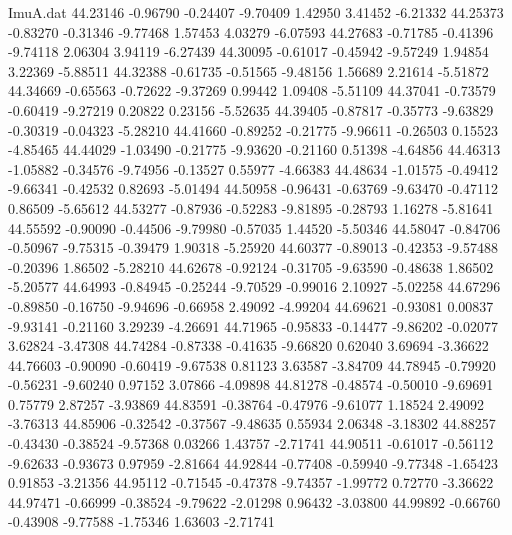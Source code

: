 \begin{filecontents}{ImuA.dat}
  44.23146   -0.96790   -0.24407   -9.70409    1.42950    3.41452   -6.21332
  44.25373   -0.83270   -0.31346   -9.77468    1.57453    4.03279   -6.07593
  44.27683   -0.71785   -0.41396   -9.74118    2.06304    3.94119   -6.27439
  44.30095   -0.61017   -0.45942   -9.57249    1.94854    3.22369   -5.88511
  44.32388   -0.61735   -0.51565   -9.48156    1.56689    2.21614   -5.51872
  44.34669   -0.65563   -0.72622   -9.37269    0.99442    1.09408   -5.51109
  44.37041   -0.73579   -0.60419   -9.27219    0.20822    0.23156   -5.52635
  44.39405   -0.87817   -0.35773   -9.63829   -0.30319   -0.04323   -5.28210
  44.41660   -0.89252   -0.21775   -9.96611   -0.26503    0.15523   -4.85465
  44.44029   -1.03490   -0.21775   -9.93620   -0.21160    0.51398   -4.64856
  44.46313   -1.05882   -0.34576   -9.74956   -0.13527    0.55977   -4.66383
  44.48634   -1.01575   -0.49412   -9.66341   -0.42532    0.82693   -5.01494
  44.50958   -0.96431   -0.63769   -9.63470   -0.47112    0.86509   -5.65612
  44.53277   -0.87936   -0.52283   -9.81895   -0.28793    1.16278   -5.81641
  44.55592   -0.90090   -0.44506   -9.79980   -0.57035    1.44520   -5.50346
  44.58047   -0.84706   -0.50967   -9.75315   -0.39479    1.90318   -5.25920
  44.60377   -0.89013   -0.42353   -9.57488   -0.20396    1.86502   -5.28210
  44.62678   -0.92124   -0.31705   -9.63590   -0.48638    1.86502   -5.20577
  44.64993   -0.84945   -0.25244   -9.70529   -0.99016    2.10927   -5.02258
  44.67296   -0.89850   -0.16750   -9.94696   -0.66958    2.49092   -4.99204
  44.69621   -0.93081    0.00837   -9.93141   -0.21160    3.29239   -4.26691
  44.71965   -0.95833   -0.14477   -9.86202   -0.02077    3.62824   -3.47308
  44.74284   -0.87338   -0.41635   -9.66820    0.62040    3.69694   -3.36622
  44.76603   -0.90090   -0.60419   -9.67538    0.81123    3.63587   -3.84709
  44.78945   -0.79920   -0.56231   -9.60240    0.97152    3.07866   -4.09898
  44.81278   -0.48574   -0.50010   -9.69691    0.75779    2.87257   -3.93869
  44.83591   -0.38764   -0.47976   -9.61077    1.18524    2.49092   -3.76313
  44.85906   -0.32542   -0.37567   -9.48635    0.55934    2.06348   -3.18302
  44.88257   -0.43430   -0.38524   -9.57368    0.03266    1.43757   -2.71741
  44.90511   -0.61017   -0.56112   -9.62633   -0.93673    0.97959   -2.81664
  44.92844   -0.77408   -0.59940   -9.77348   -1.65423    0.91853   -3.21356
  44.95112   -0.71545   -0.47378   -9.74357   -1.99772    0.72770   -3.36622
  44.97471   -0.66999   -0.38524   -9.79622   -2.01298    0.96432   -3.03800
  44.99892   -0.66760   -0.43908   -9.77588   -1.75346    1.63603   -2.71741

\end{filecontents}
